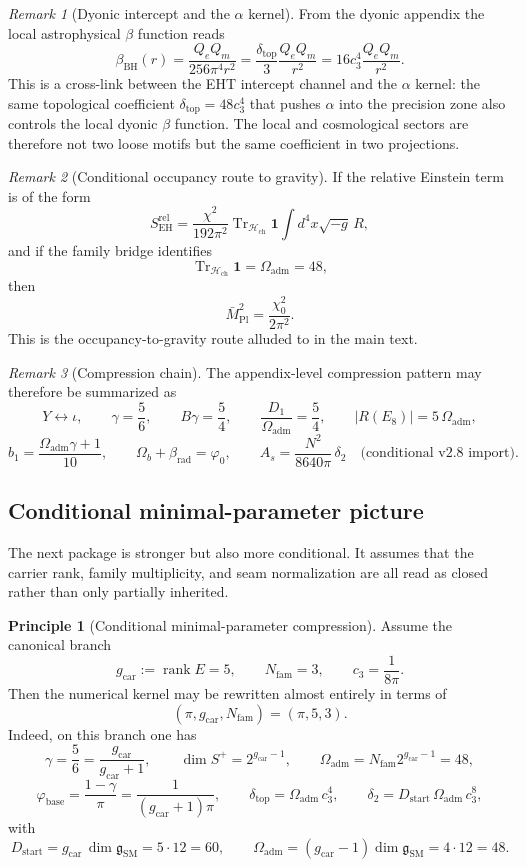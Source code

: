 \documentclass[11pt,a4paper]{article}
\theoremstyle{definition}
\newtheorem{principle}[theorem]{Principle}
\theoremstyle{remark}
\newtheorem*{remark}{Remark}
\DeclareMathOperator{\tr}{Tr}
\DeclareMathOperator{\rank}{rank}
\newcommand{\inv}{\iota}
\newcommand{\Mpl}{\bar M_{\mathrm{Pl}}}
\newcommand{\cthree}{c_3}
\newcommand{\phibase}{\varphi_{\mathrm{base}}}
\newcommand{\phiz}{\varphi_0}
\newcommand{\deltatop}{\delta_{\mathrm{top}}}
\newcommand{\bone}{b_1}
\newcommand{\SM}{\mathrm{SM}}
\newcommand{\Oadm}{\Omega_{\mathrm{adm}}}
\newcommand{\gcar}{g_{\mathrm{car}}}
\newcommand{\Dstart}{D_{\mathrm{start}}}
\begin{document}
\begin{remark}[Dyonic intercept and the $\alpha$ kernel]
From the dyonic appendix the local astrophysical $\beta$ function reads
\[
\beta_{\mathrm{BH}}(r)=\frac{Q_eQ_m}{256\pi^4 r^2}=\frac{\deltatop}{3}\frac{Q_eQ_m}{r^2}=16\cthree^4\frac{Q_eQ_m}{r^2}.
\]
This is a cross-link between the EHT intercept channel and the $\alpha$ kernel: the same topological coefficient $\deltatop=48\cthree^4$ that pushes $\alpha$ into the precision zone also controls the local dyonic $\beta$ function. The local and cosmological sectors are therefore not two loose motifs but the same coefficient in two projections.
\end{remark}

\begin{remark}[Conditional occupancy route to gravity]
If the relative Einstein term is of the form
\[
S_{\mathrm{EH}}^{\mathrm{rel}}
=
\frac{\chi^2}{192\pi^2}\tr_{\mathcal H_{\mathrm{ch}}}\mathbf 1
\int d^4x\sqrt{-g}\,R,
\]
and if the family bridge identifies
\[
\tr_{\mathcal H_{\mathrm{ch}}}\mathbf 1=\Oadm=48,
\]
then
\[
\Mpl^2=\frac{\chi_0^2}{2\pi^2}.
\]
This is the occupancy-to-gravity route alluded to in the main text.
\end{remark}

\begin{remark}[Compression chain]
The appendix-level compression pattern may therefore be summarized as
\[
Y \leftrightarrow \inv,
\qquad
\gamma=\frac56,
\qquad
B\gamma=\frac54,
\qquad
\frac{D_1}{\Oadm}=\frac54,
\qquad
|R(E_8)|=5\,\Oadm,
\]
\[
\bone=\frac{\Oadm\gamma+1}{10},
\qquad
\Omega_b+\beta_{\mathrm{rad}}=\phiz,
\qquad
A_s=\frac{N^2}{8640\pi}\,\delta_2
\quad
\text{(conditional v2.8 import)}.
\]
\end{remark}

\subsection{Conditional minimal-parameter picture}

The next package is stronger but also more conditional. It assumes that the carrier rank, family multiplicity, and seam normalization are all read as closed rather than only partially inherited.

\begin{principle}[Conditional minimal-parameter compression]
Assume the canonical branch
\[
\gcar:=\rank E=5,
\qquad
N_{\mathrm{fam}}=3,
\qquad
\cthree=\frac{1}{8\pi}.
\]
Then the numerical kernel may be rewritten almost entirely in terms of
\[
(\pi,\gcar,N_{\mathrm{fam}})=(\pi,5,3).
\]
Indeed, on this branch one has
\[
\gamma=\frac56=\frac{\gcar}{\gcar+1},
\qquad
\dim S^+=2^{\gcar-1},
\qquad
\Oadm=N_{\mathrm{fam}}2^{\gcar-1}=48,
\]
\[
\phibase=\frac{1-\gamma}{\pi}=\frac{1}{(\gcar+1)\pi},
\qquad
\deltatop=\Oadm\,\cthree^4,
\qquad
\delta_2=\Dstart\,\Oadm\,\cthree^8,
\]
with
\[
\Dstart=\gcar\,\dim\mathfrak g_{\SM}=5\cdot 12=60,
\qquad
\Oadm=(\gcar-1)\dim\mathfrak g_{\SM}=4\cdot 12=48.
\]
\end{principle}
\end{document}
